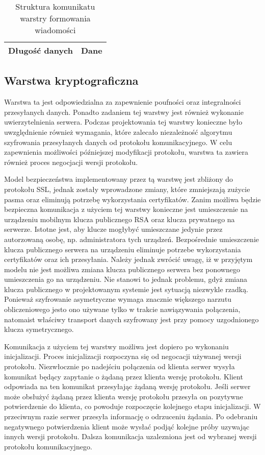 \begin{table}[H]
\centering
\caption{Struktura komunikatu warstry formowania wiadomości}

\begin{tabular}{|p{3cm}|p{6cm}|}
\hline
Długość danych & Dane\\
\hline
\end{tabular}
\end{table}


\subsection[Warstwa kryptograficzna][Warstwa kryptograficzna]{Warstwa kryptograficzna}

Warstwa ta jest odpowiedzialna za zapewnienie poufności oraz
integralności przesyłanych danych. Ponadto zadaniem tej warstwy jest
również wykonanie uwierzytelnienia serwera. Podczas projektowania tej
warstwy konieczne było uwzględnienie również wymagania, które zalecało
niezależność algorytmu szyfrowania przesyłanych danych od protokołu
komunikacyjnego. W celu zapewnienia możliwości późniejszej modyfikacji
protokołu, warstwa ta zawiera również proces negocjacji wersji
protokołu.

Model bezpieczeństwa implementowany przez tą warstwę jest zbliżony do
protokołu SSL, jednak zostały wprowadzone zmiany, które zmniejszają
zużycie pasma oraz eliminują potrzebę wykorzystania
certyfikatów. Zanim możliwa będzie bezpieczna komunikacja z użyciem
tej warstwy konieczne jest umieszczenie na urządzeniu mobilnym klucza
publicznego RSA oraz klucza prywatnego na serwerze. Istotne jest, aby
klucze mogłybyć umieszczane jedynie przez autorzowaną osobę,
np. administratora tych urządzeń. Bezpośrednie umieszczenie klucza
publicznego serwera na urządzeniu eliminuje potrzebe wykorzystania
certyfikatów oraz ich przesyłania. Należy jednak zwrócić uwagę, iż w
przyjętym modelu nie jest możliwa zmiana klucza publicznego serwera
bez ponownego umieszczenia go na urządzeniu. Nie stanowi to jednak
problemu, gdyż zmiana klucza publicznego w projektowanym systemie jest
sytuacją niezwykle rzadką. Ponieważ szyfrowanie asymetryczne wymaga
znacznie większego narzutu obliczeniowego jesto ono używane tylko w
trakcie nawiązywania połączenia, natomaist właściwy transport danych
szyfrowany jest przy pomocy uzgodnionego klucza symetrycznego.

Komunikacja z użyciem tej warstwy możliwa jest dopiero po wykonaniu
inicjalizacji. Proces inicjalizacji rozpoczyna się od negocacji
używanej wersji protokołu. Niezwłocznie po nadejściu połączenia od
klienta serwer wysyła komunikat będący zapytanie o żądaną przez
klienta wersję protokołu. Klient odpowiada na ten komunikat
przesyłając żądaną wersję protokołu. Jeśli serwer może obsłużyć żądaną
przez klienta wersję protokołu przesyła on pozytywne potwierdzenie do
klienta, co powoduje rozpoczęcie kolejnego etapu inicjalizacji. W
przeciwnym razie serwer przesyła informację o odrzuceniu żądania. Po
odebraniu negatywnego potwierdzenia klient może wysłać podjąć kolejne
próby uzywając innych wersji protokołu. Dalsza komunikacja uzalezniona
jest od wybranej wersji protokołu komunikacyjnego.

